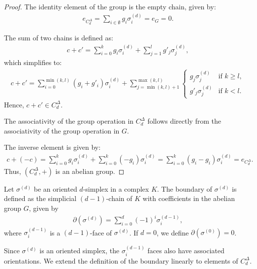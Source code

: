 \begin{proof}
The identity element of the group is the empty chain, given by:
\begin{align}
e_{C^{\Delta}_d} = \sum_{i \in \emptyset} g_{i} \sigma_{i}^{(d)} = e_{G} = 0.
\end{align}

The sum of two chains is defined as:
\begin{align}
c + c' = \sum_{i=0}^{k} g_{i} \sigma_{i}^{(d)} + \sum_{j=1}^{l} g'_{j} \sigma_{j}^{(d)},
\end{align}
which simplifies to:
\begin{align}
c + c' = \sum_{i=0}^{\min(k, l)} (g_{i} + g'_{i}) \sigma_{i}^{(d)} + \sum_{j=\min(k, l)+1}^{\max(k, l)}
\begin{cases}
g_{j} \sigma_{j}^{(d)} & \text{if } k \geq l, \\
g'_{j} \sigma_{j}^{(d)} & \text{if } k < l.
\end{cases}
\end{align}
Hence, \( c + c' \in C^{\Delta}_{d} \).

The associativity of the group operation in \( C^{\Delta}_{d} \) follows directly from
the associativity of the group operation in \( G \).

The inverse element is given by:
\begin{align}
c + (-c) = \sum_{i=0}^{k} g_{i} \sigma_{i}^{(d)} + \sum_{i=0}^{k} (-g_{i}) \sigma_{i}^{(d)} = \sum_{i=0}^{k} (g_{i} - g_{i}) \sigma_{i}^{(d)} = e_{C^{\Delta}_d}.
\end{align}
Thus, \( (C^{\Delta}_{d}, +) \) is an abelian group.
\end{proof}

\begin{definition}[Boundary]{\cite[p.106]{hatcher2005algebraic}} 
Let \( \sigma^{(d)} \) be an oriented \( d \)-simplex in a complex \( K \). The boundary of \( \sigma^{(d)} \) is defined as the simplicial \( (d-1) \)-chain of \( K \) with coefficients in the abelian group \( G \), given by
\begin{align}
\partial(\sigma^{(d)}) = \sum_{i=0}^{d} (-1)^{i} \sigma^{(d-1)}_{i},
\end{align}
where \( \sigma^{(d-1)}_{i} \) is a \( (d-1) \)-face of \( \sigma^{(d)} \). If \( d = 0 \), we define \( \partial(\sigma^{(0)}) = 0 \).
\end{definition}

Since \( \sigma^{(d)} \) is an oriented simplex, the \( \sigma^{(d-1)}_{i} \) faces also have associated orientations. We extend the definition of the boundary linearly to elements of \( C^{\Delta}_{d} \).

